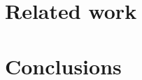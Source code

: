 \documentclass[a4,10pt]{article}
\begin{document}
  \section{Related work}





  \section{Conclusions}
\end{document}

